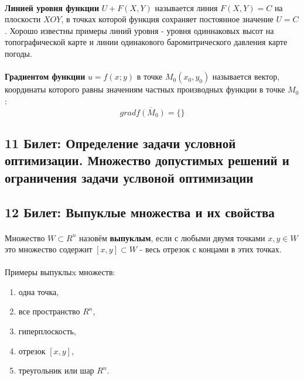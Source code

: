 \documentclass[14pt, letterpaper]{article}
\begin{document}
\paragraph{}

\textbf{Линией уровня функции} $U + F(X, Y)$ называется линия $F(X, Y) = C$ на плоскости $XOY$, в точках которой функция сохраняет постоянное значение $U = C$.
Хорошо известны примеры линий уровня - уровня одиннаковых высот на топографической карте и линии одинакового баромитрического давления карте погоды.
\paragraph{}

\textbf{Градиентом функции} $u = f(x; y)$ в точке $M_{0}(x_{0}, y_{0})$ называется вектор, координаты которого равны значениям частных производных функции в точке $M_{0}$:
    $$grad \overline{f(M_{0})} = \{ \}$$

\newpage
\subsection{11 Билет: Определение задачи условной оптимизации. Множество допустимых решений и ограничения задачи 
услвоной оптимизации}

\newpage
\subsection{12 Билет: Выпуклые множества и их свойства}
\paragraph{}
Множество $W \subset R^{n}$ назовём \textbf{выпуклым}, если с любыми двумя точками $x, y \in W$ это множество содержит $[x, y] \subset W$ - весь отрезок с концами в этих точках.

\paragraph{}
Примеры выпуклыx множеств:
\begin{enumerate}
    \item одна точка, 
    \item все пространство $R^{n}$,
    \item гиперплоскость,
    \item отрезок $[x, y]$,
    \item треугольник или шар $R^{n}$.
\end{enumerate}
\end{document}
